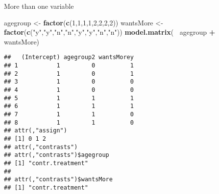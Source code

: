 \documentclass[
  ignorenonframetext,
]{beamer}
\newenvironment{Shaded}{\begin{snugshade}}{\end{snugshade}}
\newcommand{\DecValTok}[1]{\textcolor[rgb]{0.00,0.00,0.81}{#1}}
\newcommand{\KeywordTok}[1]{\textcolor[rgb]{0.13,0.29,0.53}{\textbf{#1}}}
\newcommand{\NormalTok}[1]{#1}
\newcommand{\OperatorTok}[1]{\textcolor[rgb]{0.81,0.36,0.00}{\textbf{#1}}}
\newcommand{\StringTok}[1]{\textcolor[rgb]{0.31,0.60,0.02}{#1}}
\begin{document}
\begin{frame}[fragile]{More than one variable}
\protect\hypertarget{more-than-one-variable}{}

\begin{Shaded}
\begin{Highlighting}[]
\NormalTok{agegroup <-}\StringTok{ }\KeywordTok{factor}\NormalTok{(}\KeywordTok{c}\NormalTok{(}\DecValTok{1}\NormalTok{,}\DecValTok{1}\NormalTok{,}\DecValTok{1}\NormalTok{,}\DecValTok{1}\NormalTok{,}\DecValTok{2}\NormalTok{,}\DecValTok{2}\NormalTok{,}\DecValTok{2}\NormalTok{,}\DecValTok{2}\NormalTok{))}
\NormalTok{wantsMore <-}\StringTok{ }\KeywordTok{factor}\NormalTok{(}\KeywordTok{c}\NormalTok{(}\StringTok{"y"}\NormalTok{,}\StringTok{"y"}\NormalTok{,}\StringTok{"n"}\NormalTok{,}\StringTok{"n"}\NormalTok{,}\StringTok{"y"}\NormalTok{,}\StringTok{"y"}\NormalTok{,}\StringTok{"n"}\NormalTok{,}\StringTok{"n"}\NormalTok{))}
\KeywordTok{model.matrix}\NormalTok{(}\OperatorTok{~}\StringTok{ }\NormalTok{agegroup }\OperatorTok{+}\StringTok{ }\NormalTok{wantsMore)}
\end{Highlighting}
\end{Shaded}

\begin{verbatim}
##   (Intercept) agegroup2 wantsMorey
## 1           1         0          1
## 2           1         0          1
## 3           1         0          0
## 4           1         0          0
## 5           1         1          1
## 6           1         1          1
## 7           1         1          0
## 8           1         1          0
## attr(,"assign")
## [1] 0 1 2
## attr(,"contrasts")
## attr(,"contrasts")$agegroup
## [1] "contr.treatment"
## 
## attr(,"contrasts")$wantsMore
## [1] "contr.treatment"
\end{verbatim}

\end{frame}
\end{document}
